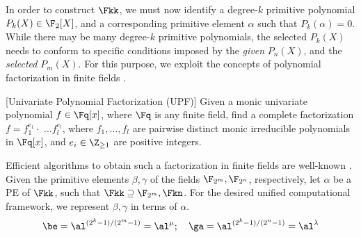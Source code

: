 \par In order to construct $\Fkk$, we must now identify
a degree-$k$ primitive polynomial $P_{k}(X)\in\F_2[X]$, and a
corresponding primitive element $\alpha$ such that
$P_k(\alpha)=0$. While there may be many degree-$k$ primitive
polynomials, the selected $P_k(X)$ needs to conform to specific
conditions imposed by the {\it given} $P_n(X)$, and
the {\it selected} $P_m(X)$.
For this purpose, we exploit the concepts of polynomial
factorization in finite fields \cite{factorization_fq:survey}. 



\begin{Problem}{[Univariate Polynomial Factorization (UPF)]}
Given a monic univariate polynomial $f \in \Fq[x]$, where $\Fq$ is
any finite field, find a complete factorization $f = f_1^{e_1}\cdot$ 
$\dots f_l^{e_l}$, where $f_1,\dots, f_l$ are pairwise
distinct monic irreducible polynomials in $\Fq[x]$, and
$e_i\in \Z_{\geq 1}$ are positive integers.
\end{Problem}

Efficient algorithms to obtain such a factorization in finite fields
are well-known \cite{factorization_fq:survey}. %
Given the primitive elements $\beta, \gamma$ of the fields 
$\F_{2^m},\F_{2^n}$, respectively, let $\alpha$ be a PE of $\Fkk$,
such that $\Fkk \supseteq \F_{2^m},\Fkn$. For the desired unified
computational framework, we represent $\beta, \gamma$ in terms
of $\alpha$. 
\vspace{-0.06in}
\begin{equation}
\label{word-level-rep}
 \be = \al^{(2^k-1)/(2^m-1)} = \al^{\mu};~~~
 \ga = \al^{(2^k-1)/(2^n-1)} = \al^{\lambda}
\end{equation}
\vspace{-0.2in}

